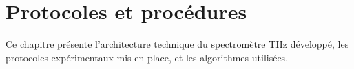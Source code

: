 
\chapter{Protocoles et procédures}
\label{chap:protocoles}

Ce chapitre présente l'architecture technique du spectromètre THz développé, les protocoles expérimentaux mis en place, et les algorithmes utilisées. 











